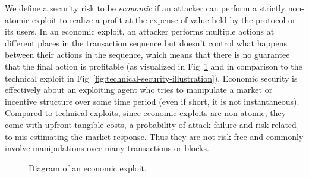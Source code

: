 We define a security risk to be \emph{economic} if an attacker can perform a strictly non-atomic exploit to realize a profit at the expense of value held by the protocol or its users.
In an economic exploit, an attacker performs multiple actions at different places in the transaction sequence but doesn't control what happens between their actions in the sequence, which means that there is no guarantee that the final action is profitable (as visualized in Fig~\ref{fig:economic-security-illustration2} and in comparison to the technical exploit in Fig~\ref{fig:technical-security-illustration}).
Economic security is effectively about an exploiting agent who tries to manipulate a market or incentive structure over some time period (even if short, it is not instantaneous). Compared to technical exploits, since economic exploits are non-atomic, they come with upfront tangible costs, a probability of attack failure and risk related to mis-estimating the market response. Thus they are not risk-free and commonly involve manipulations over many transactions or blocks.

\begin{figure}[htp]
    \centering
        \caption{Diagram of an economic exploit.}
        \label{fig:economic-security-illustration2}
  \end{figure}
  

